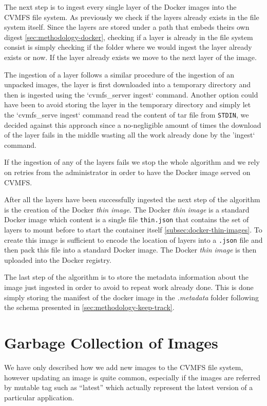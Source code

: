 The next step is to ingest every single layer of the Docker images into the
CVMFS file system. As previously we check if the layers already exists in the
file system itself. Since the layers are stored under a path that embeds theirs
own digest \ref{sec:methodology-docker}, checking if a layer is already in the
file system consist is simply checking if the folder where we would ingest the
layer already exists or now.  If the layer already exists we move to the next
layer of the image.

The ingestion of a layer follows a similar procedure of the ingestion of an
unpacked images, the layer is first downloaded into a temporary directory and
then is ingested using the `cvmfs\_server ingest` command. Another option could
have been to avoid storing the layer in the temporary directory and simply let
the `cvmfs\_serve ingest` command read the content of tar file from
\texttt{STDIN}, we decided against this approach since a no-negligible amount
of times the download of the layer fails in the middle wasting all the work
already done by the 'ingest` command.

If the ingestion of any of the layers fails we stop the whole algorithm and we
rely on retries from the administrator in order to have the Docker image served
on CVMFS.

After all the layers have been successfully ingested the next step of the
algorithm is the creation of the Docker \textit{thin image}. The Docker
\textit{thin image} is a standard Docker image which content is a single file
\texttt{thin.json} that contains the set of layers to mount before to start the
container itself \ref{subsec:docker-thin-images}. To create this image is
sufficient to encode the location of layers into a \texttt{.json} file and then
pack this file into a standard Docker image. The Docker \textit{thin image} is
then uploaded into the Docker registry.

The last step of the algorithm is to store the metadata information about the
image just ingested in order to avoid to repeat work already done. This is done
simply storing the manifest of the docker image in the \textit{.metadata}
folder following the schema presented in \ref{sec:methodology-keep-track}.

\section{Garbage Collection of Images}\label{sec:implementation-gc}

We have only described how we add new images to the CVMFS file system, however
updating an image is quite common, especially if the images are referred by
mutable tag such as “latest” which actually represent the latest version of a
particular application.

